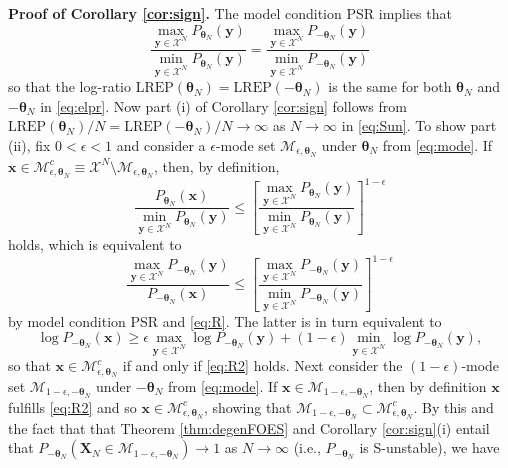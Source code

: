 \documentclass[numbib]{imamat}
\theoremstyle{theorem}
\theoremstyle{lemma}
\theoremstyle{example}
\theoremstyle{corollary}
\theoremstyle{definition}
\theoremstyle{remark}
\theoremstyle{approximation}
\theoremstyle{scheme}
\newcommand{\REP}{\mathrm{LREP}}
\begin{document}
\textbf{Proof of Corollary \ref{cor:sign}.} The model condition PSR implies that
\begin{equation}
\label{eq:R}
\frac{\max_{\boldsymbol y \in \mathcal{X}^N}P_{\boldsymbol \theta_N}(\boldsymbol y)  }{\min_{\boldsymbol y \in \mathcal{X}^N}P_{\boldsymbol \theta_N}(\boldsymbol y) } = \frac{\max_{\boldsymbol y \in \mathcal{X}^N}P_{-\boldsymbol \theta_N}(\boldsymbol y) }{\min_{\boldsymbol y \in \mathcal{X}^N}P_{-\boldsymbol \theta_N}(\boldsymbol y) }
\end{equation}
so that the log-ratio \(\REP(\boldsymbol \theta_N)=\REP(-\boldsymbol \theta_N)\) is the same for both \(\boldsymbol \theta_N\) and \(-\boldsymbol \theta_N\) in \eqref{eq:elpr}. Now part (i) of Corollary \ref{cor:sign} follows from \(\REP(\boldsymbol \theta_N)/N=\REP(-\boldsymbol \theta_N)/N\to \infty\) as \(N\to \infty\) in \eqref{eq:Sun}. To show part (ii), fix \(0 < \epsilon < 1\) and consider a \(\epsilon\)-mode set \(\mathcal{M}_{\epsilon, \boldsymbol \theta_N}\) under \(\boldsymbol \theta_N\) from \eqref{eq:mode}. If \(\boldsymbol x \in \mathcal{M}_{\epsilon, \boldsymbol \theta_N}^c \equiv \mathcal{X}^N \setminus \mathcal{M}_{\epsilon, \boldsymbol \theta_N}\), then, by definition,
\[
\frac{P_{\boldsymbol \theta_N}(\boldsymbol x)}{\min_{\boldsymbol y \in \mathcal{X}^N}P_{\boldsymbol \theta_N}(\boldsymbol y)} \leq \left[\frac{\max_{\boldsymbol y \in \mathcal{X}^N}P_{\boldsymbol \theta_N}(\boldsymbol y)  }{\min_{\boldsymbol y \in \mathcal{X}^N}P_{\boldsymbol \theta_N}(\boldsymbol y) } \right]^{1-\epsilon}
\]
holds, which is equivalent to
\[
\frac{\max_{\boldsymbol y \in \mathcal{X}^N}P_{-\boldsymbol \theta_N}(\boldsymbol y)}{P_{-\boldsymbol \theta_N}(\boldsymbol x)} \leq
\left[\frac{\max_{\boldsymbol y \in \mathcal{X}^N}P_{-\boldsymbol \theta_N}(\boldsymbol y)  }{\min_{\boldsymbol y \in \mathcal{X}^N}P_{-\boldsymbol \theta_N}(\boldsymbol y) } \right]^{1-\epsilon}
\]
by model condition PSR and \eqref{eq:R}. The latter is in turn equivalent to
\begin{equation}
\label{eq:R2}
\log P_{-\boldsymbol \theta_N}(\boldsymbol x) \geq \epsilon \max\limits_{\boldsymbol y \in \mathcal{X}^N} \log  P_{-\boldsymbol \theta_N}(\boldsymbol y) + (1-\epsilon)\min\limits_{\boldsymbol y \in \mathcal{X}^N} \log P_{-\boldsymbol \theta_N}(\boldsymbol y),
\end{equation}
so that \(\boldsymbol x \in \mathcal{M}_{\epsilon, \boldsymbol \theta_N}^c\) if and only if \eqref{eq:R2} holds. Next consider the \((1-\epsilon)\)-mode set \(\mathcal{M}_{1-\epsilon, -\boldsymbol \theta_N}\) under \(-\boldsymbol \theta_N\) from \eqref{eq:mode}. If \(\boldsymbol x \in\mathcal{M}_{1-\epsilon, -\boldsymbol \theta_N}\), then by definition \(\boldsymbol x\) fulfills \eqref{eq:R2} and so \(\boldsymbol x \in \mathcal{M}_{\epsilon, \boldsymbol \theta_N}^c\), showing that \(\mathcal{M}_{1-\epsilon, -\boldsymbol \theta_N} \subset \mathcal{M}_{\epsilon, \boldsymbol \theta_N}^c\). By this and the fact that that Theorem \ref{thm:degenFOES} and Corollary \ref{cor:sign}(i) entail that \(P_{-\boldsymbol \theta_N}(\boldsymbol X_N \in \mathcal{M}_{1-\epsilon, -\boldsymbol \theta_N})\to 1\) as \(N\to \infty\) (i.e., \(P_{-\boldsymbol \theta_N}\) is S-unstable), we have
\end{document}
